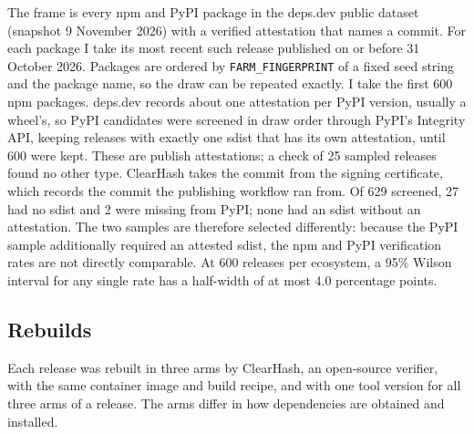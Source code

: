 \documentclass[11pt]{article}
\begin{document}
The frame is every npm and PyPI package in the deps.dev public dataset
\cite{depsdev} (snapshot 9 November 2026) with a verified attestation that
names a commit. For each package I take its most recent such release
published on or before 31 October 2026. Packages are ordered by
\texttt{FARM\_FINGERPRINT} of a fixed seed string and the package name,
so the draw can be repeated exactly. I take the first 600 npm packages.
deps.dev records about one attestation per PyPI version, usually a
wheel's, so PyPI candidates were screened in draw order through PyPI's
Integrity API, keeping releases with exactly one sdist that has its own
attestation, until 600 were kept. These are publish attestations; a check
of 25 sampled releases found no other type. ClearHash takes the commit
from the signing certificate, which records the commit the publishing
workflow ran from. Of 629 screened, 27 had no sdist and 2
were missing from PyPI; none had an sdist without an attestation. The two
samples are therefore selected differently: because the PyPI sample
additionally required an attested sdist, the npm and PyPI verification
rates are not directly comparable. At 600 releases per
ecosystem, a 95\% Wilson interval for any single rate has a half-width
of at most 4.0 percentage points.

\subsection{Rebuilds}

Each release was rebuilt in three arms by ClearHash, an open-source
verifier, with the same container image and build recipe, and with one
tool version for all three arms of a release. The arms differ in how dependencies are obtained and installed.
\end{document}
